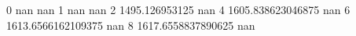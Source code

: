 0 nan nan
1 nan nan
2 1495.126953125 nan
4 1605.838623046875 nan
6 1613.6566162109375 nan
8 1617.6558837890625 nan
